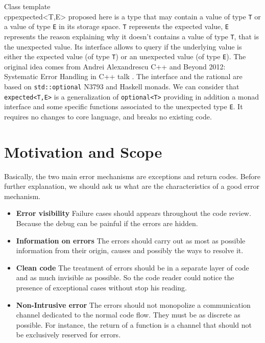 \documentclass[a4paper,10pt]{article}
\newcommand{\cpp}[1]{\lstinline{#1}}
\begin{document}
Class template \\cpp{expected<T,E>} proposed here is a type that may contain a value of type \cpp{T} or a value of type \cpp{E} in its storage space. \cpp{T} represents the expected value, \cpp{E} represents the reason explaining why it doesn't contains a value of type \cpp{T}, that is the unexpected value. Its interface allows to query if the underlying value is either the expected value (of type \cpp{T}) or an unexpected value (of type \cpp{E}). The original idea comes from Andrei Alexandrescu C++ and Beyond 2012: Systematic Error Handling in C++ talk \cite{AlexandrescuExpected}. The interface and the rational are based on \cpp{std::optional} N3793 \cite{OptionalRev5} and Haskell monads. We can consider that \cpp{expected<T,E>} is a generalization of \cpp{optional<T>} providing in addition a monad interface and some specific functions associated to the unexpected type \cpp{E}. It requires no changes to core language, and breaks no existing code.

\section{Motivation and Scope}
\label{motiv-scope}

Basically, the two main error mechanisms are exceptions and return codes. Before further explanation, we should ask us what are the characteristics of a good error mechanism.

\begin{itemize}
 \item \textbf{Error visibility} Failure cases should appears throughout the code review. Because the debug can be painful if the errors are hidden.
 \item \textbf{Information on errors} The errors should carry out as most as possible information from their origin, causes and possibly the ways to resolve it.
 \item \textbf{Clean code} The treatment of errors should be in a separate layer of code and as much invisible as possible. So the code reader could notice the presence of exceptional cases without stop his reading.
 \item \textbf{Non-Intrusive error} The errors should not monopolize a communication channel dedicated to the normal code flow. They must be as discrete as possible. For instance, the return of a function is a channel that should not be exclusively reserved for errors.
\end{itemize}
\end{document}
